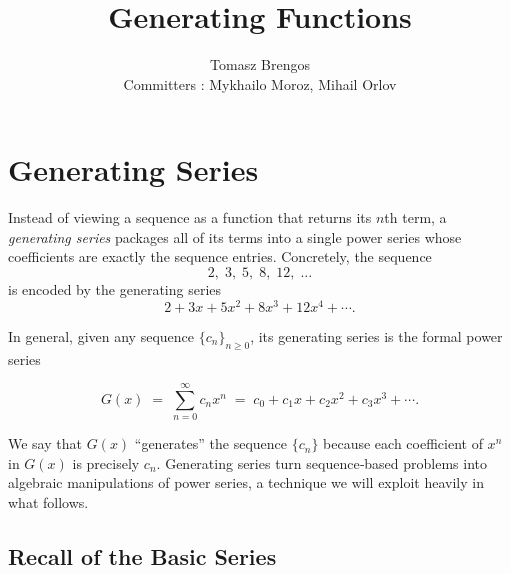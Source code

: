 \documentclass[docmute]{article}
\title{Generating Functions}
\author{Tomasz Brengos \\  
Committers : Mykhailo Moroz, Mihail Orlov}
\date{}
\begin{document}
\maketitle
\section{Generating Series}

Instead of viewing a sequence as a function that returns its \(n\)th term, a \emph{generating series} packages all of its terms into a single power series whose coefficients are exactly the sequence entries.  Concretely, the sequence
\[
2,\;3,\;5,\;8,\;12,\;\dots
\]
is encoded by the generating series
\[
2 + 3x + 5x^2 + 8x^3 + 12x^4 + \cdots.
\]

In general, given any sequence \(\{c_n\}_{n\ge0}\), its generating series is the formal power series

\[
G(x) \;=\; \sum_{n=0}^\infty c_n x^n 
\;=\;
c_0 + c_1 x + c_2 x^2 + c_3 x^3 + \cdots.
\]

We say that \(G(x)\) “generates” the sequence \(\{c_n\}\) because each coefficient of \(x^n\) in \(G(x)\) is precisely \(c_n\).  Generating series turn sequence‑based problems into algebraic manipulations of power series, a technique we will exploit heavily in what follows.

\subsection*{Recall of the Basic Series}
\end{document}
